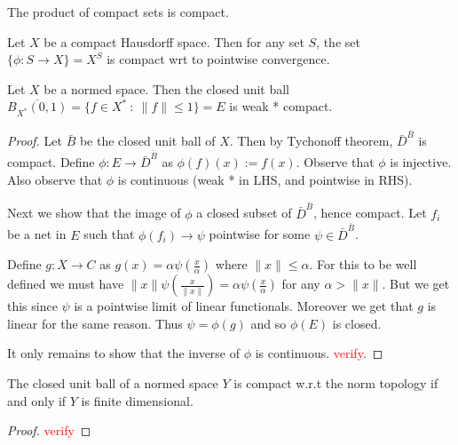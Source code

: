 
\begin{theorem}[Tychonoff]
  The product of compact sets is compact.
\end{theorem}
\begin{corollary}
  Let $X$ be a compact Hausdorff space. Then for any set $S$, the set
  $\{ \phi: S \to X \} = X^S$ is compact wrt to pointwise convergence.
\end{corollary}

\begin{theorem}
  Let $X$ be a normed space. Then the closed unit ball
  $\overline{B_{X^*}(0, 1)} = \{ f \in X^* \ : \ \|f\| \le 1 \} = E$
  is weak * compact.
\end{theorem}
\begin{proof}
  Let $\bar{B}$ be the closed unit ball of $X$. Then by Tychonoff
  theorem, $\bar{D}^{\bar{B}}$ is compact. Define $\phi: E \to
  \bar{D}^{\bar{B}}$ as $\phi(f)(x) := f(x)$. Observe that $\phi$ is injective.
  Also observe that $\phi$ is continuous (weak * in LHS, and pointwise in RHS).

  Next we show that the image of $\phi$ a closed subset of $\bar{D}^{
  \bar{B}}$, hence compact. Let $f_i$ be a net in $E$ such that
  $\phi(f_i) \to \psi$ pointwise for some $\psi \in \bar{D}^{\bar{B}}$.

  Define $g: X \to C$ as $g(x) = \alpha \psi( \frac{x}{ \alpha} )$
  where $\|x\| \le \alpha$. For this to be well defined we must have
  $\|x\| \psi(\frac{x}{\|x\|}) = \alpha \psi( \frac{x}{ \alpha})$ for
  any $ \alpha >  \|x\|$. But we get this since $\psi$ is a pointwise
  limit of linear functionals. Moreover we get that $g$ is linear for
  the same reason. Thus $\psi = \phi(g)$ and so $\phi(E)$ is closed.

  It only remains to show that the inverse of $\phi$ is continuous.
  \textcolor{red}{verify}.
\end{proof}

\begin{remark}
  The closed unit ball of a normed space $Y$ is compact w.r.t the
  norm topology if and only if $Y$ is finite dimensional.
\end{remark}
\begin{proof}
  \textcolor{red}{verify}
\end{proof}

